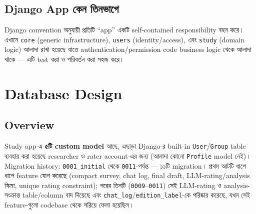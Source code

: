 \documentclass[11pt,a4paper]{article}
\newcommand{\code}[1]{\texttt{\small #1}}
\begin{document}
\subsection{Django App কেন তিনভাগে}

Django convention অনুযায়ী প্রতিটি ``app'' একটি self-contained responsibility বহন করে। এখানে
\code{core} (generic infrastructure), \code{users} (identity/access), এবং \code{study}
(domain logic) আলাদা রাখা হয়েছে যাতে authentication/permission code business logic থেকে আলাদা
থাকে --- এটি test করা ও পরিবর্তন করা সহজ করে।

\newpage
\section{Database Design}
\label{sec:db}

\subsection{Overview}

Study app-এ \textbf{৫টি custom model} আছে, এছাড়া Django-র built-in \code{User}/\code{Group}
table ব্যবহার করা হয়েছে researcher ও rater account-এর জন্য (আলাদা কোনো \code{Profile} model
নেই)। Migration history: \code{0001\_initial} থেকে \code{0011}-পর্যন্ত --- ১১টি migration।
প্রথম আটটি ধাপে ধাপে feature যোগ করেছে (compact survey, chat log, final draft, LLM-rating/analysis
স্কিমা, unique rating constraint); পরের তিনটি (\code{0009}--\code{0011}) সেই LLM-rating ও
analysis-সংক্রান্ত table/column বাদ দিয়েছে এবং \code{chat\_log}/\code{edition\_label}-কে
পরিষ্কার করেছে, যখন সেই feature-গুলো codebase থেকে সরিয়ে ফেলা হয়েছিল।
\end{document}
